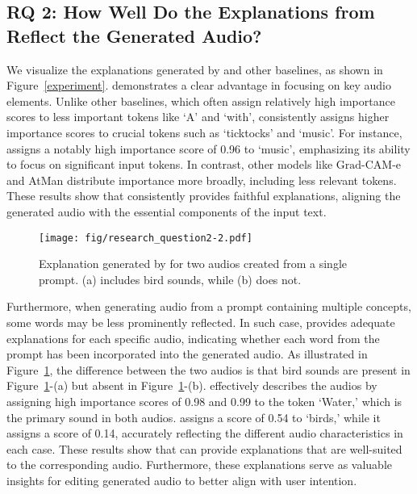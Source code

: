 \subsection{RQ 2: How Well Do the Explanations from \mname{} Reflect the Generated Audio?}

We visualize the explanations generated by \mname{} and other baselines, as shown in Figure~\ref{experiment}. \mname{} demonstrates a clear advantage in focusing on key audio elements. Unlike other baselines, which often assign relatively high importance scores to less important tokens like `A' and `with', \mname{} consistently assigns higher importance scores to crucial tokens such as `ticktocks' and `music'. For instance, \mname{} assigns a notably high importance score of 0.96 to `music', emphasizing its ability to focus on significant input tokens. In contrast, other models like $\text{Grad-CAM-e}$ and AtMan distribute importance more broadly, including less relevant tokens. These results show that \mname{} consistently provides faithful explanations, aligning the generated audio with the essential components of the input text.

\begin{figure}
    \center
    \texttt{[image: fig/research\_question2-2.pdf]}
    \caption{Explanation generated by \mname{} for two audios created from a single prompt. (a) includes bird sounds, while (b) does not.}
    \label{rq2}
\end{figure}

Furthermore, when generating audio from a prompt containing multiple concepts, some words may be less prominently reflected. In such case, \mname{} provides adequate explanations for each specific audio, indicating whether each word from the prompt has been incorporated into the generated audio. As illustrated in Figure~\ref{rq2}, the difference between the two audios is that bird sounds are present in Figure~\ref{rq2}-(a) but absent in Figure~\ref{rq2}-(b).
\mname{} effectively describes the audios by assigning high importance scores of 0.98 and 0.99 to the token `Water,' which is the primary sound in both audios. \mname{} assigns a score of 0.54 to `birds,' while it assigns a score of 0.14, accurately reflecting the different audio characteristics in each case. These results show that \mname{} can provide explanations that are well-suited to the corresponding audio. Furthermore, these explanations serve as valuable insights for editing generated audio to better align with user intention. 

